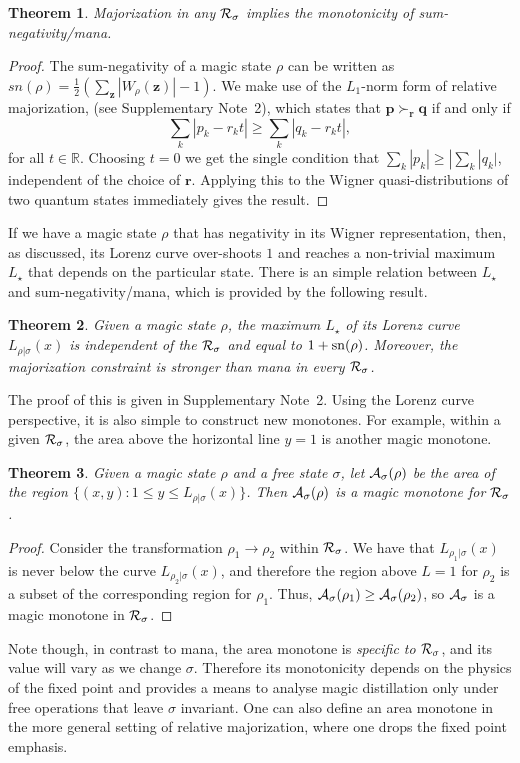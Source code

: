 \documentclass[
onecolumn,
superscriptaddress
]{revtex4-1}
\newtheorem{theorem}{Theorem}
\def\z{\boldsymbol{z}}
\def\r{\boldsymbol{r}}
\def\p{\boldsymbol{p}}
\def\q{\boldsymbol{q}}
\def\q{\boldsymbol{q}}
\def\A{{\cal A}}
\def\R{{\cal R}}
\begin{document}
\begin{theorem} Majorization in any $\R_\sigma$ implies the monotonicity of sum-negativity/mana. 
\end{theorem}
\begin{proof}
	The sum-negativity of a magic state $\rho$ can be written as $sn(\rho) =\frac{1}{2} (\sum_{\z} |W_\rho(\z) | - 1)$.
We make use of the $L_1$-norm form of relative majorization, (see Supplementary Note~2), which states that $\p \succ_{\r} \q$ if and only if
	\begin{equation}
\sum_k | p_k - r_k t | \geq \sum_k | q_k - r_k t |,
\end{equation}
for all $t\in \mathbb{R}$. Choosing $t=0$ we get the single condition that $\sum_k |p_k| \ge |\sum_k |q_k|$, independent of the choice of $\r$. Applying this to the Wigner quasi-distributions of two quantum states immediately gives the result.
\end{proof}

If we have a magic state $\rho$ that has negativity in its Wigner representation, then, as discussed, its Lorenz curve over-shoots $1$ and reaches a non-trivial maximum $L_\star$ that depends on the particular state. There is an simple relation between $L_\star$ and sum-negativity/mana, which is provided by the following result. 
\begin{theorem}\label{lem:lcmax}
	Given a magic state $\rho$, the maximum $L_\star$ of its Lorenz curve $L_{\rho|\sigma}(x)$ is independent of the $\R_\sigma$ and equal to $1+{\rm sn}(\rho)$. Moreover, the majorization constraint is stronger than mana in every $\R_\sigma$.
\end{theorem}
The proof of this is given in Supplementary Note~2. Using the Lorenz curve perspective, it is also simple to construct new monotones. For example, within a given $\R_\sigma$, the area above the horizontal line $y = 1$ is another magic monotone.
\begin{theorem}
Given a magic state $\rho$ and a free state $\sigma$, let $\A_\sigma(\rho)$ be the area of the region $\{(x, y): 1 \leq y \leq L_{\rho | \sigma}(x)\}$. Then $\A_\sigma(\rho)$ is a magic monotone for $\R_\sigma$.
\end{theorem}
\begin{proof}
Consider the transformation $\rho_1 \rightarrow \rho_2$ within $\R_\sigma$. We have that $L_{\rho_1|\sigma}(x)$ is never below the curve $L_{\rho_2|\sigma}(x)$, and therefore the region above $L=1$ for $\rho_2$ is a subset of the corresponding region for $\rho_1$. Thus, $\A_\sigma(\rho_1) \geq \A_\sigma(\rho_2)$, so $\A_\sigma$ is a magic monotone in $\R_\sigma$.
\end{proof}
Note though, in contrast to mana, the area monotone is \emph{specific to $\R_\sigma$}, and its value will vary as we change $\sigma$. Therefore its monotonicity depends on the physics of the fixed point and provides a means to analyse magic distillation only under free operations that leave $\sigma$ invariant. One can also define an area monotone in the more general setting of relative majorization, where one drops the fixed point emphasis.
\end{document}
